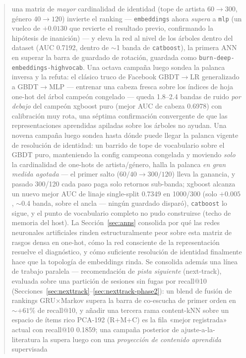 \documentclass[11pt]{article}
\begin{document}
\begin{abstract}
una matriz de \emph{mayor} cardinalidad de identidad (tope de artista
$60\to300$, género $40\to120$) invierte el ranking --- \texttt{embeddings} ahora
\emph{supera} a \texttt{mlp} (un vuelco de $+0.0130$ que revierte el resultado
previo, confirmando la hipótesis de inanición) --- y eleva la red al nivel de
los árboles dentro del dataset (AUC \num{0.7192}, dentro de $\sim$1 banda de
\texttt{catboost}), la primera ANN en superar la barra de guardado de rotación,
guardada como \texttt{burn-deep-embeddings-highvocab}. Una octava campaña luego
sondea la palanca inversa y la refuta: el clásico truco de Facebook GBDT$\to$LR
generalizado a GBDT$\to$MLP --- entrenar una cabeza fresca sobre los índices de
hoja one-hot del árbol campeón congelado --- queda \num{1.8}--\num{2.4} bandas
de ruido \emph{por debajo} del campeón xgboost puro (mejor AUC de cabeza
\num{0.6978}) con calibración muy rota, una séptima confirmación convergente de
que las representaciones aprendidas apiladas sobre los árboles no ayudan. Una
novena campaña luego sondea hasta dónde puede llegar la palanca vigente de
resolución de identidad: un barrido de tope de vocabulario sobre el GBDT puro,
manteniendo la config campeona congelada y moviendo \emph{solo} la cardinalidad
de one-hots de artista/género, halla la palanca \emph{en gran medida agotada}
--- el primer salto ($60/40\to300/120$) lleva la ganancia, y pasado 300/120 cada
paso paga solo retornos sub-banda; xgboost alcanza un nuevo mejor AUC de linaje
single-split \num{0.7349} en 1000/300 (solo $+0.005$, $\sim$0.4 banda, sobre el
ancla --- ningún guardado disparó), \texttt{catboost} lo sigue, y el punto de
vocabulario completo no pudo construirse (techo de memoria del host). La
Sección~\ref{sec:anns} consolida por qué las redes neuronales artificiales
rinden estructuralmente peor sobre esta matriz de rasgos densa en one-hot, cómo
la red consciente de la representación resuelve el diagnóstico, y cómo suficiente
resolución de identidad finalmente hace que la topología de embeddings rinda. Se
consolida además una línea de trabajo paralela --- recomendación de \emph{pista
siguiente} (next-track), evaluada sobre una partición de sesiones sin fugas por
recall@10 (Secciones~\ref{sec:nexttrack}--\ref{sec:nexttrack-phase2}): un blend
de fusión de rankings GRU$\times$Markov supera la barra de co-escucha de primer
orden en $\sim$$+61\%$ de recall@10, y añadir una tercera rama content-kNN sobre
un espacio de ítems rico PCA-192 (R+M+C) es la fila «mejor registrada» actual
con recall@10 \num{0.1859}; una campaña posterior de ajuste-a-la-literatura la
supera luego con una \emph{proyección de contenido aprendida} supervisada
$$
\end{abstract}
\end{document}

